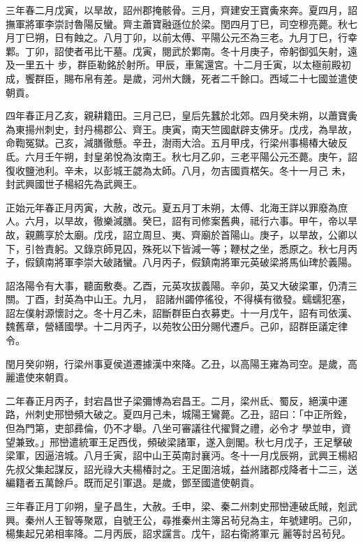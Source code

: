 \begin{pinyinscope}
 三年春二月戊寅，以旱故，詔州郡掩骸骨。三月，齊建安王寶夤來奔。夏四月，詔撫軍將軍李崇討魯陽反蠻。齊主蕭寶融遜位於梁。閏四月丁巳，司空穆亮薨。秋七月丁巳朔，日有蝕之。八月丁卯，以前太傅、平陽公元丕為三老。九月丁巳，行幸鄴。丁卯，詔使者弔比干墓。戊寅，閱武於鄴南。冬十月庚子，帝躬御弧矢射，遠及一里五十
 步，群臣勒銘於射所。甲辰，車駕還宮。十二月壬寅，以太極前殿初成，饗群臣，賜布帛有差。是歲，河州大饑，死者二千餘口。西域二十七國並遣使朝貢。



 四年春正月乙亥，親耕籍田。三月己巳，皇后先蠶於北郊。四月癸未朔，以蕭寶夤為東揚州刺史，封丹楊郡公、齊王。庚寅，南天竺國獻辟支佛牙。戊戌，為旱故，命鞫冤獄。己亥，減膳徹懸。辛丑，澍雨大洽。五月甲戌，行梁州事楊椿大破反氐。六月壬午朔，封皇弟悅為汝南王。秋七月乙卯，三老平陽公元丕薨。庚午，詔復收鹽池利。辛未，以彭城王勰為太師。八月，勿吉國貢楛矢。冬十一月己
 未，封武興國世子楊紹先為武興王。



 正始元年春正月丙寅，大赦，改元。夏五月丁未朔，太傅、北海王詳以罪廢為庶人。六月，以旱故，徹樂減膳。癸巳，詔有司修案舊典，祗行六事。甲午，帝以旱故，親薦享於太廟。戊戌，詔立周旦、夷、齊廟於首陽山。庚子，以旱故，公卿以下，引咎責躬。又錄京師見囚，殊死以下皆減一等；鞭杖之坐，悉原之。秋七月丙子，假鎮南將軍李崇大破諸蠻。八月丙子，假鎮南將軍元英破梁將馬仙琕於義陽。



 詔洛陽令有大事，聽面敷奏。乙酉，元英攻拔義陽。辛卯，英又大破梁軍，仍清三關。丁酉，封英為中山王。九月，
 詔諸州蠲停徭役，不得橫有徵發。蠕蠕犯塞，詔左僕射源懷討之。冬十月乙未，詔斷群臣白衣募吏。十一月戊午，詔有司依漢、魏舊章，營繕國學。十二月丙子，以苑牧公田分賜代遷戶。己卯，詔群臣議定律令。



 閏月癸卯朔，行梁州事夏侯道遷據漢中來降。乙丑，以高陽王雍為司空。是歲，高麗遣使來朝貢。



 二年春正月丙子，封宕昌世子梁彌博為宕昌王。二月，梁州氐、蜀反，絕漢中運路，州刺史邢巒頻大破之。夏四月己未，城陽王鸞薨。乙丑，詔曰：「中正所銓，但為門第，吏部彞倫，仍不才舉。八坐可審議往代擢賢之禮，必令才
 學並申，資望兼致。」邢巒遣統軍王足西伐，頻破梁諸軍，遂入劍閣。秋七月戊子，王足擊破梁軍，因逼涪城。八月壬寅，詔中山王英南討襄沔。冬十一月戊辰朔，武興王楊紹先叔父集起謀反，詔光祿大夫楊椿討之。王足圍涪城，益州諸郡戍降者十二三，送編籍者五萬餘戶。既而足引軍退。是歲，鄧至國遣使朝貢。



 三年春正月丁卯朔，皇子昌生，大赦。壬申，梁、秦二州刺史邢巒連破氐賊，剋武興。秦州人王智等聚眾，自號王公，尋推秦州主簿呂茍兒為主，年號建明。己卯，楊集起兄弟相率降。二月丙辰，詔求讜言。戊午，詔右衛將軍元
 麗等討呂茍兒。




\end{pinyinscope}
